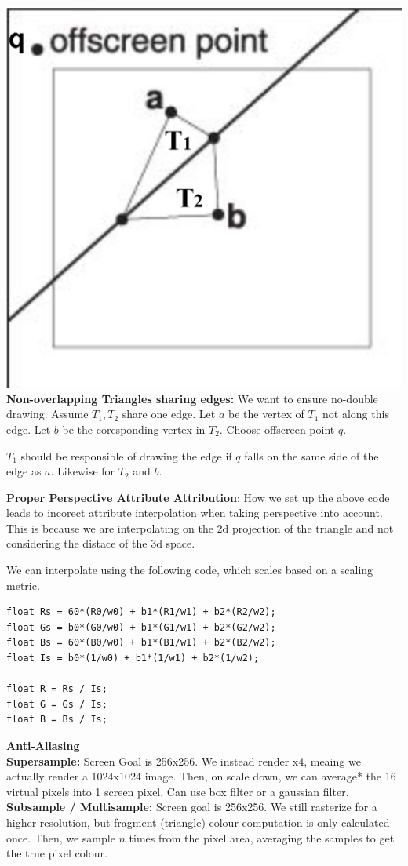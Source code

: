 \documentclass[letterpaper, 8pt]{extarticle}
\begin{document}
\begin{multicols*}{4}
\includegraphics[width=.5\linewidth]{rasterize-triangle-edge.png}
\textbf{Non-overlapping Triangles sharing edges:} We want to ensure no-double drawing.
Assume $T_1, T_2$ share one edge. Let $a$ be the vertex of $T_1$ not along this edge. Let $b$ be the coresponding vertex in $T_2$.
Choose offscreen point $q$.

$T_1$ should be responsible of drawing the edge if $q$ falls on the same side of the edge as $a$. Likewise for $T_2$ and $b$.

\textbf{Proper Perspective Attribute Attribution}: How we set up the above code leads to incorect attribute interpolation when taking perspective into account.
This is because we are interpolating on the 2d projection of the triangle and not considering the distace of the 3d space.

We can interpolate using the following code, which scales based on a scaling metric.

\begin{lstlisting}
float Rs = 60*(R0/w0) + b1*(R1/w1) + b2*(R2/w2);
float Gs = b0*(G0/w0) + b1*(G1/w1) + b2*(G2/w2);
float Bs = 60*(B0/w0) + b1*(B1/w1) + b2*(B2/w2);
float Is = b0*(1/w0) + b1*(1/w1) + b2*(1/w2);

float R = Rs / Is;
float G = Gs / Is;
float B = Bs / Is;
\end{lstlisting}


\textbf{Anti-Aliasing}\\
\textbf{Supersample: }Screen Goal is 256x256. We instead render x4, meaing we actually render a 1024x1024 image.
Then, on scale down, we can average* the 16 virtual pixels into 1 screen pixel.
Can use box filter or a gaussian filter.\\
\textbf{Subsample / Multisample: }
Screen goal is 256x256. We still rasterize for a higher resolution, but fragment (triangle) colour computation is only calculated once.
Then, we sample $n$ times from the pixel area, averaging the samples to get the true pixel colour.



\end{multicols*}
\end{document}
